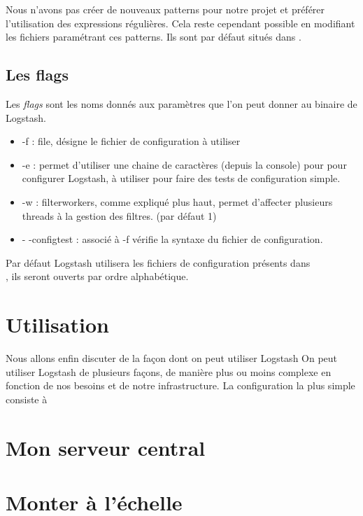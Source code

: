Nous n'avons pas créer de nouveaux patterns pour notre projet et préférer l'utilisation
des expressions régulières. Cela reste cependant possible en modifiant les fichiers 
paramétrant ces patterns. Ils sont par défaut situés dans .



\subsection{Les flags}
Les \emph{flags} sont les noms donnés aux paramètres que l'on peut donner au binaire
de Logstash.

\begin{itemize}
    \item -f : file, désigne le fichier de configuration à utiliser
    \item -e : permet d'utiliser une chaine de caractères (depuis la console) pour
    pour configurer Logstash, à utiliser pour faire des tests de configuration simple.
    \item -w : filterworkers, comme expliqué plus haut, permet d'affecter plusieurs
    threads à la gestion des filtres. (par défaut 1)
    \item - -configtest : associé à -f  vérifie la syntaxe 
    du fichier de configuration.
\end{itemize}

Par défaut Logstash utilisera les fichiers de configuration présents dans \\ 
, ils seront ouverts par ordre alphabétique.


\section{Utilisation}
Nous allons enfin discuter de la façon dont on peut utiliser Logstash
On peut utiliser Logstash de plusieurs façons, de manière plus ou moins complexe 
en fonction de nos besoins et de notre infrastructure.
La configuration la plus simple consiste à 


\section{Mon serveur central}



\section{Monter à l'échelle}




